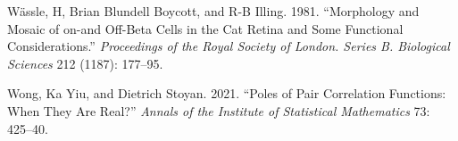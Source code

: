 \begin{CSLReferences}{1}{0}
\leavevmode{}%
Wässle, H, Brian Blundell Boycott, and R-B Illing. 1981. {``Morphology and Mosaic of on-and Off-Beta Cells in the Cat Retina and Some Functional Considerations.''} \emph{Proceedings of the Royal Society of London. Series B. Biological Sciences} 212 (1187): 177--95.

\leavevmode{}%
Wong, Ka Yiu, and Dietrich Stoyan. 2021. {``Poles of Pair Correlation Functions: When They Are Real?''} \emph{Annals of the Institute of Statistical Mathematics} 73: 425--40.

\end{CSLReferences}



\address{%
Jonatan A. González\\
King Abdullah University of Science and Technology (KAUST)\\%
Computer, Electrical and Mathematical Sciences and Engineering Division\\ Thuwal, 23955-6900, Saudi Arabia\\
%
%
\textit{ORCiD: \href{https://orcid.org/0000-0002-2296-5271}{0000-0002-2296-5271}}\\%
\href{mailto:jonathan.gonzalez@kaust.edu.sa}{\nolinkurl{jonathan.gonzalez@kaust.edu.sa}}%
}

\address{%
Paula Moraga\\
King Abdullah University of Science and Technology (KAUST)\\%
Computer, Electrical and Mathematical Sciences and Engineering Division\\ Thuwal, 23955-6900, Saudi Arabia\\
%
\url{http://www.paulamoraga.com}\\%
\textit{ORCiD: \href{https://orcid.org/0000-0001-5266-0201}{0000-0001-5266-0201}}\\%
\href{mailto:paula.moraga@kaust.edu.sa}{\nolinkurl{paula.moraga@kaust.edu.sa}}%
}
